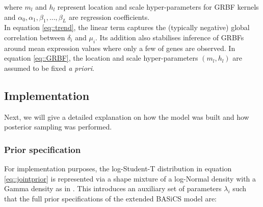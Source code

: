 where $m_l$ and $h_l$ represent location and scale hyper-parameters for GRBF kernels and $\alpha_0, \alpha_1, \beta_1, \ldots, \beta_L$ are regression coefficients. \\

In equation \eqref{eq::trend}, the linear term captures the (typically negative) global correlation between $\delta_i$ and $\mu_i$. Its addition also stabilises inference of GRBFs around mean expression values where only a few of genes are observed. In equation \eqref{eq::GRBF}, the location and scale hyper-parameters $(m_l, h_l)$ are assumed to be fixed \emph{a priori}. %


\newpage

\subsection{Implementation}

Next, we will give a detailed explanation on how the model was built and how posterior sampling was performed.  

\subsubsection{Prior specification}

For implementation purposes, the log-Student-T distribution in equation \eqref{eq::jointprior} is represented via a shape mixture of a log-Normal density with a Gamma density as in \cite{Vallejos2015}. This introduces an auxiliary set of parameters $\lambda_i$ such that the full prior specifications of the extended BASiCS model are:

